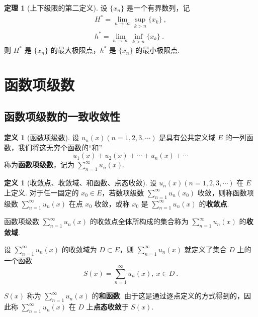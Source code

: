 \documentclass[zihao=-4,linespread=1.8,UTF8,nothm]{aytony_base}
\theoremstyle{definition}
\newtheorem{theorem}{\indent\heiti\textbf{定理}}[subsection]
\newtheorem{definition}{\indent\heiti\textbf{定义}}[subsection]
\newtheorem*{definition*}{\indent\heiti\textbf{定义}}
\begin{document}
\begin{theorem}[上下级限的第二定义]
    设 $\{x_n\}$ 是一个有界数列，记 $$
        \begin{aligned}
            H^* = \lim\limits_{n \to \infty} \sup_{k>n}\{x_k\}\ , \\
            h^* = \lim\limits_{n \to \infty} \inf_{k > n}\{x_k\}\ .
        \end{aligned}
    $$ 则 $H^*$ 是 $\{x_n\}$ 的最大极限点，$h^*$ 是 $\{x_n\}$ 的最小极限点.
\end{theorem}

\section{函数项级数}
\subsection{函数项级数的一致收敛性}

\begin{definition*}[函数项级数]
    设 $u_n(x)(n = 1, 2, 3, \cdots)$ 是具有公共定义域 $E$ 的一列函数，我们将这无穷个函数的“和” $$
        u_1(x) + u_2(x) + \cdots + u_n(x) + \cdots
    $$ 称为\textbf{函数项级数}，记为 $\sum\limits_{n = 1}^{\infty}u_n(x)$.
\end{definition*}

\begin{definition}[收敛点、收敛域、和函数、点态收敛]

    设 $u_n(x)(n = 1, 2, 3, \cdots)$ 在 $E$ 上定义. 对于任一固定的 $x_0 \in E$，若数项级数 $\sum\limits_{n=1}^{\infty}u_n(x_0)$ 收敛，则称函数项级数 $\sum\limits_{n = 1}^{\infty}u_n(x)$ 在点 $x_0$ 收敛，或称 $x_0$ 是 $\sum\limits_{n = 1}^{\infty}u_n(x)$ 的\textbf{收敛点}.

    函数项级数 $\sum\limits_{n = 1}^{\infty}u_n(x)$ 的收敛点全体所构成的集合称为 $\sum\limits_{n = 1}^{\infty}u_n(x)$ 的\textbf{收敛域}.

    设 $\sum\limits_{n = 1}^{\infty}u_n(x)$ 的收敛域为 $D \subset E$，则 $\sum\limits_{n = 1}^{\infty}u_n(x)$ 就定义了集合 $D$ 上的一个函数 $$
        S(x) = \sum\limits_{n = 1}^{\infty}u_n(x),\ x \in D\ .
    $$

    $S(x)$ 称为 $\sum\limits_{n = 1}^{\infty}u_n(x)$ 的\textbf{和函数}. 由于这是通过逐点定义的方式得到的，因此称 $\sum\limits_{n = 1}^{\infty}u_n(x)$ 在 $D$ 上\textbf{点态收敛}于 $S(x)$.

\end{definition}
\end{document}
